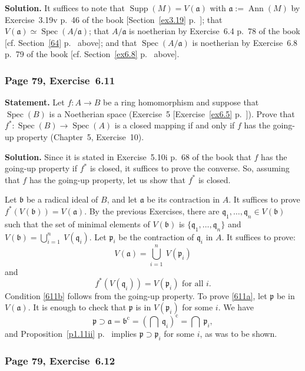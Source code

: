 \documentclass[12pt,letterpaper]{article}%
\newcommand{\oo}{\operatorname}\newcommand{\ooo}{\operatorname*}
\newcommand{\mf}{\mathfrak}
\newcommand{\aaa}{\mf a}
\newcommand{\bbb}{\mf b}
\newcommand{\ppp}{\mf p}
\newcommand{\qqq}{\mf q}
\newcommand{\Spec}{\operatorname{Spec}}\newcommand{\Sp}{\operatorname{Spec}}
\newcommand{\nn}{\noindent}
\begin{document}
\nn\textbf{Solution.} It suffices to note that $\oo{Supp}(M)=V(\aaa)$ with $\aaa:=\oo{Ann}(M)$ by Exercise~3.19v p.~46 of the book [Section~\ref{ex3.19} p.~\pageref{ex3.19}]; that $V(\aaa)\simeq\Spec(A/\aaa)$; that $A/\aaa$ is noetherian by Exercise~6.4 p.~78 of the book [cf. Section~\ref{64} p.~\pageref{64} above]; and that $\Spec(A/\aaa)$ is noetherian by Exercise~6.8 p.~79 of the book [cf. Section~\ref{ex6.8} p.~\pageref{ex6.8} above].

\subsubsection{Page 79, Exercise~6.11}%

\textbf{Statement.} Let $f:A\to B$ be a ring homomorphism and suppose that $\Spec(B)$ is a Noetherian space (Exercise~5 [Exercise~\ref{ex6.5} p.~\pageref{ex6.5}]). Prove that $f^*:\Spec(B)\to\Spec(A)$ is a closed mapping if and only if $f$ has the going-up property (Chapter~5, Exercise~10). 

\nn\textbf{Solution.} Since it is stated in Exercise~5.10i p.~68 of the book that $f$ has the going-up property if $f^*$ is closed, it suffices to prove the converse. So, assuming that $f$ has the going-up property, let us show that $f^*$ is closed. 

Let $\bbb$ be a radical ideal of $B$, and let $\aaa$ be its contraction in $A$. It suffices to prove $f^*(V(\bbb))=V(\aaa)$. By the previous Exercises, there are $\qqq_1,\dots,\qqq_n\in V(\bbb)$ such that the set of minimal elements of $V(\bbb)$ is $\{\qqq_1,\dots,\qqq_n\}$ and $V(\bbb)=\bigcup_{i=1}^n\ V(\qqq_i)$. Let $\ppp_i$ be the contraction of $\qqq_i$ in $A$. It suffices to prove: 
\begin{equation}\label{611a}
V(\aaa)=\bigcup_{i=1}^n\ V(\ppp_i)
\end{equation} 
and 
\begin{equation}\label{611b}
f^*(V(\qqq_i))=V(\ppp_i)\text{ for all }i.
\end{equation} 
Condition \eqref{611b} follows from the going-up property. To prove \eqref{611a}, let $\ppp$ be in $V(\aaa)$. It is enough to check that $\ppp$ is in $V(\ppp_i)$ for some $i$. We have 
$$
\ppp\supset\aaa=\bbb^{\oo c}=\left(\bigcap\ \qqq_i\right)^{\oo c}=\bigcap\ \ppp_i,
$$ 
and Proposition~\ref{p1.11ii} p.~\pageref{p1.11ii} implies $\ppp\supset\ppp_i$ for some $i$, as was to be shown. 

\subsubsection{Page 79, Exercise~6.12}%
\end{document}
